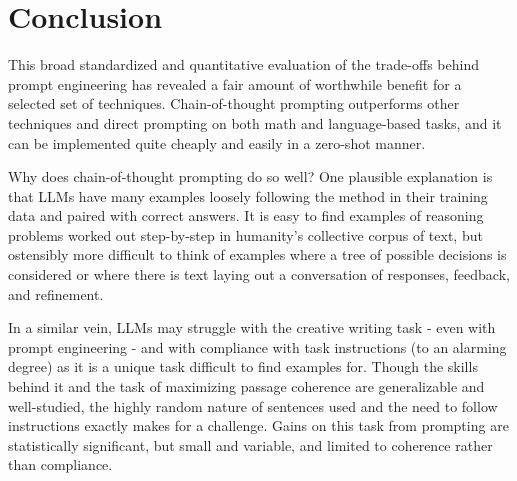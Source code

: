 \documentclass[11pt]{article}
\begin{document}

%     

%     


\section*{Conclusion}

This broad standardized and quantitative evaluation of the trade-offs behind prompt engineering has revealed a fair amount of worthwhile benefit for a selected set of techniques. Chain-of-thought prompting outperforms other techniques and direct prompting on both math and language-based tasks, and it can be implemented quite cheaply and easily in a zero-shot manner.

Why does chain-of-thought prompting do so well? One plausible explanation is that LLMs have many examples loosely following the method in their training data and paired with correct answers. It is easy to find examples of reasoning problems worked out step-by-step in humanity's collective corpus of text, but ostensibly more difficult to think of examples where a tree of possible decisions is considered or where there is text laying out a conversation of responses, feedback, and refinement.

In a similar vein, LLMs may struggle with the creative writing task - even with prompt engineering - and with compliance with task instructions (to an alarming degree) as it is a unique task difficult to find examples for. Though the skills behind it and the task of maximizing passage coherence are generalizable and well-studied, the highly random nature of sentences used and the need to follow instructions exactly makes for a challenge. Gains on this task from prompting are statistically significant, but small and variable, and limited to coherence rather than compliance.
\end{document}
